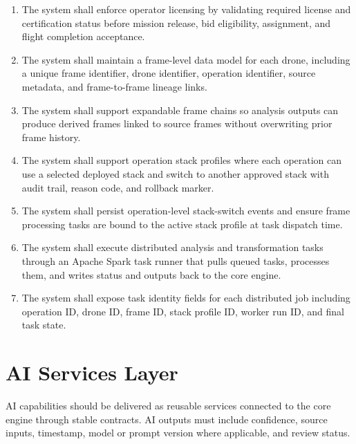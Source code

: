 \documentclass[11pt,a4paper]{article}
\begin{document}
\begin{enumerate}[leftmargin=*]
    \item The system shall enforce operator licensing by validating required license and certification status before mission release, bid eligibility, assignment, and flight completion acceptance.
    \item The system shall maintain a frame-level data model for each drone, including a unique frame identifier, drone identifier, operation identifier, source metadata, and frame-to-frame lineage links.
    \item The system shall support expandable frame chains so analysis outputs can produce derived frames linked to source frames without overwriting prior frame history.
    \item The system shall support operation stack profiles where each operation can use a selected deployed stack and switch to another approved stack with audit trail, reason code, and rollback marker.
    \item The system shall persist operation-level stack-switch events and ensure frame processing tasks are bound to the active stack profile at task dispatch time.
    \item The system shall execute distributed analysis and transformation tasks through an Apache Spark task runner that pulls queued tasks, processes them, and writes status and outputs back to the core engine.
    \item The system shall expose task identity fields for each distributed job including operation ID, drone ID, frame ID, stack profile ID, worker run ID, and final task state.
\end{enumerate}

\section{AI Services Layer}

AI capabilities should be delivered as reusable services connected to the core engine through stable contracts. AI outputs must include confidence, source inputs, timestamp, model or prompt version where applicable, and review status.
\end{document}

